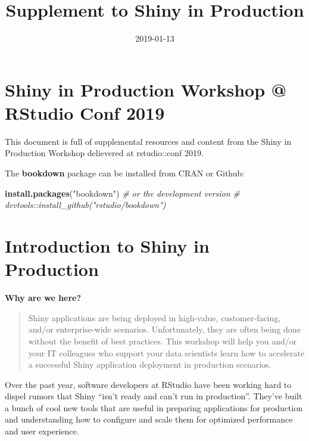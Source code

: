 \documentclass[]{book}
\title{Supplement to Shiny in Production}
\author{}
\date{2019-01-13}
\newenvironment{Shaded}{\begin{snugshade}}{\end{snugshade}}
\newcommand{\CommentTok}[1]{\textcolor[rgb]{0.56,0.35,0.01}{\textit{#1}}}
\newcommand{\KeywordTok}[1]{\textcolor[rgb]{0.13,0.29,0.53}{\textbf{#1}}}
\newcommand{\NormalTok}[1]{#1}
\newcommand{\StringTok}[1]{\textcolor[rgb]{0.31,0.60,0.02}{#1}}
\theoremstyle{definition}
\theoremstyle{definition}
\theoremstyle{definition}
\theoremstyle{remark}
\begin{document}
\maketitle

{
\setcounter{tocdepth}{1}
\tableofcontents
}
\hypertarget{shiny-in-production-workshop-rstudio-conf-2019}{%
\chapter{Shiny in Production Workshop @ RStudio Conf
2019}\label{shiny-in-production-workshop-rstudio-conf-2019}}

This document is full of supplemental resources and content from the
Shiny in Production Workshop delievered at rstudio::conf 2019.

The \textbf{bookdown} package can be installed from CRAN or Github:

\begin{Shaded}
\begin{Highlighting}[]
\KeywordTok{install.packages}\NormalTok{(}\StringTok{"bookdown"}\NormalTok{)}
\CommentTok{# or the development version}
\CommentTok{# devtools::install_github("rstudio/bookdown")}
\end{Highlighting}
\end{Shaded}

\hypertarget{course-intro}{%
\chapter{Introduction to Shiny in Production}\label{course-intro}}

\textbf{Why are we here?}

\begin{quote}
Shiny applications are being deployed in high-value, customer-facing,
and/or enterprise-wide scenarios. Unfortunately, they are often being
done without the benefit of best practices. This workshop will help you
and/or your IT colleagues who support your data scientists learn how to
accelerate a successful Shiny application deployment in production
scenarios.
\end{quote}

Over the past year, software developers at RStudio have been working
hard to dispel rumors that Shiny ``isn't ready and can't run in
production''. They've built a bunch of cool new tools that are useful in
preparing applications for production and understanding how to configure
and scale them for optimized performance and user experience.
\end{document}
